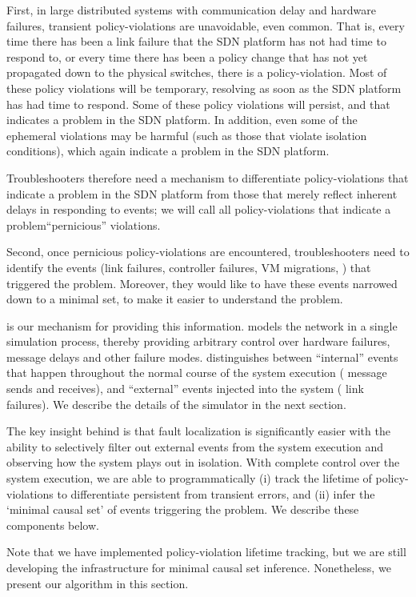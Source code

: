 First, in large distributed
systems with communication delay and hardware failures, transient policy-violations
are unavoidable, even common. That is, every time there has been a link failure that the SDN platform has not had time to respond to, or every time there has been a policy change that has not yet propagated down to the physical switches, there is a policy-violation.  Most of these policy violations will be temporary, resolving as soon as the SDN platform has had time to respond.  Some of these policy violations will persist, and that indicates a problem in the SDN platform.  In addition, even some of the ephemeral violations may be harmful (such as those that violate isolation conditions), which again indicate a problem in the SDN platform.

Troubleshooters therefore need a mechanism to differentiate
policy-violations that indicate a problem in the SDN platform from those that merely reflect inherent delays in responding to events; we will call all policy-violations that indicate a problem``pernicious'' violations.

Second, once pernicious policy-violations are encountered, troubleshooters need to
identify the events (link failures, controller failures, VM migrations,
\etc{}) that triggered the problem. Moreover, they would like to have these events narrowed down to a minimal set, to make it easier to understand the problem.

\Simulator{} is our mechanism for providing this information. \Simulator{} models
the network in a single simulation process, thereby providing arbitrary control over hardware
failures, message delays and other failure modes. \Simulator{} distinguishes
between ``internal'' events that happen throughout the normal course of the
system execution (\eg{} message sends and receives), and ``external'' events
injected into the system (\eg{} link failures). We describe the details
of the simulator in the next section.

The key insight behind
\simulator{} is that fault localization is significantly easier with the
ability to selectively filter
out external events from the system execution and observing how the system
plays out in isolation.
With complete control over the
system execution, we are able to programmatically (i) track the lifetime of
policy-violations to differentiate persistent from transient errors, and (ii)
infer the `minimal causal set' of events triggering the problem. We describe
these components below.

Note that we have implemented policy-violation lifetime tracking, but we are
still developing the infrastructure for minimal causal set inference.
Nonetheless, we present our algorithm in this section.

